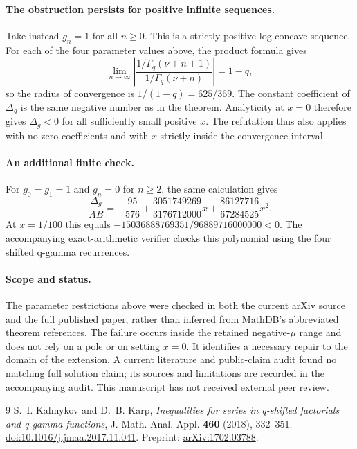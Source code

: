 \documentclass[11pt]{article}
\newcommand{\Gq}{\Gamma_q}
\begin{document}
\paragraph{The obstruction persists for positive infinite sequences.}
Take instead $g_n=1$ for all $n\ge0$. This is a strictly positive
log-concave sequence. For each of the four parameter values above,
the product formula gives
\[
 \lim_{n\to\infty}\left|
 \frac{1/\Gq(\nu+n+1)}{1/\Gq(\nu+n)}\right|=1-q,
\]
so the radius of convergence is $1/(1-q)=625/369$.
The constant coefficient of $\Delta_g$ is the same negative number
as in the theorem. Analyticity at $x=0$ therefore gives
$\Delta_g<0$ for all sufficiently small positive $x$.
The refutation thus also applies with no zero coefficients and with
$x$ strictly inside the convergence interval.

\paragraph{An additional finite check.}
For $g_0=g_1=1$ and $g_n=0$ for $n\ge2$, the same calculation gives
\[
 \frac{\Delta_g}{AB}
 =-\frac{95}{576}
  +\frac{3051749269}{3176712000}x
  +\frac{86127716}{67284525}x^2.
\]
At $x=1/100$ this equals
$-15036888769351/96889716000000<0$.
The accompanying exact-arithmetic verifier checks this polynomial
using the four shifted q-gamma recurrences.

\paragraph{Scope and status.}
The parameter restrictions above were checked in both the current
arXiv source and the full published paper, rather than inferred from
MathDB's abbreviated theorem references. The failure occurs inside
the retained negative-$\mu$ range and does not rely on a pole or on
setting $x=0$. It identifies a necessary repair to the domain of the
extension. A current literature and public-claim audit found no
matching full solution claim; its sources and limitations are recorded
in the accompanying audit. This manuscript has not received external
peer review.

\begin{thebibliography}{9}
S.~I. Kalmykov and D.~B. Karp,
\emph{Inequalities for series in q-shifted factorials and q-gamma
functions}, J. Math. Anal. Appl. \textbf{460} (2018), 332--351.
\href{https://doi.org/10.1016/j.jmaa.2017.11.041}
{doi:10.1016/j.jmaa.2017.11.041}.
Preprint: \href{https://arxiv.org/abs/1702.03788}{arXiv:1702.03788}.
\end{thebibliography}
\end{document}
